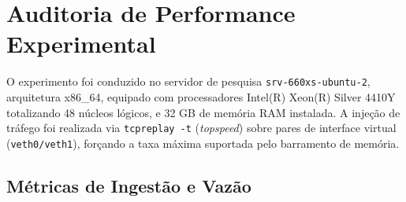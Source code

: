 \documentclass[12pt,a4paper]{article}
\begin{document}
\section{Auditoria de Performance Experimental}
O experimento foi conduzido no servidor de pesquisa \texttt{srv-660xs-ubuntu-2}, arquitetura x86\_64, equipado com processadores Intel(R) Xeon(R) Silver 4410Y totalizando 48 n\'{u}cleos l\'{o}gicos, e 32 GB de mem\'{o}ria RAM instalada. A inje\c{c}\~{a}o de tr\'{a}fego foi realizada via \texttt{tcpreplay -t} (\textit{topspeed}) sobre pares de interface virtual (\texttt{veth0/veth1}), for\c{c}ando a taxa m\'{a}xima suportada pelo barramento de mem\'{o}ria.

\subsection{M\'{e}tricas de Ingest\~{a}o e Vaz\~{a}o}
\end{document}
